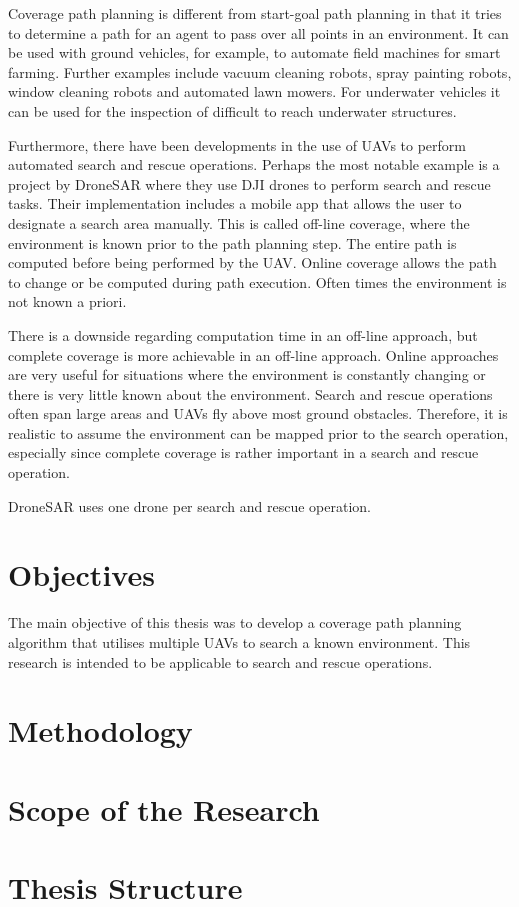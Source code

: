 Coverage path planning is different from start-goal path planning in that it tries to determine a path for an agent to pass over all points in an environment\cite{Choset2001}. It can be used with ground vehicles, for example, to automate field machines for smart farming\cite{Hameed2014}. Further examples include vacuum cleaning robots, spray painting robots\cite{Atkar2005}, window cleaning robots\cite{Mir-Nasiri2018} and automated lawn mowers\cite{Arkin1999}. For underwater vehicles it can be used for the inspection of difficult to reach underwater structures\cite{Englot2012}. 

Furthermore, there have been developments in the use of UAVs to perform automated search and rescue operations. Perhaps the most notable example is a project by DroneSAR where they use DJI drones to perform search and rescue tasks. Their implementation includes a mobile app that allows the user to designate a search area manually\cite{DroneSAR01}. This is called off-line coverage, where the environment is known prior to the path planning step. The entire path is computed before being performed by the UAV. Online coverage allows the path to change or be computed during path execution. Often times the environment is not known a priori\cite{CPP-Survey-2019}. 

There is a downside regarding computation time in an off-line approach, but complete coverage is more achievable in an off-line approach. Online approaches are very useful for situations where the environment is constantly changing or there is very little known about the environment. Search and rescue operations often span large areas and UAVs fly above most ground obstacles. Therefore, it is realistic to assume the environment can be mapped prior to the search operation, especially since complete coverage is rather important in a search and rescue operation.\cite{CPP-Survey-2013}

DroneSAR uses one drone per search and rescue operation. 

\section{Objectives}

The main objective of this thesis was to develop a coverage path planning algorithm that utilises multiple UAVs to search a known environment. This research is intended to be applicable to search and rescue operations.\linebreak
\cite{CPP-Survey-2019}


\section{Methodology}


\section{Scope of the Research}


\section{Thesis Structure}
